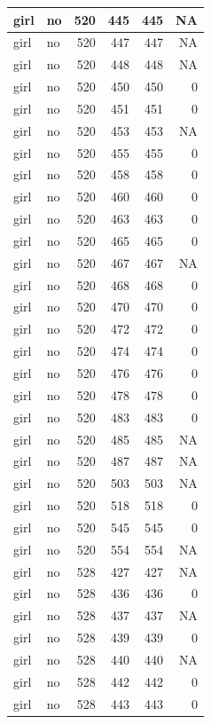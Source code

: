 \documentclass[man]{apa6}
\begin{document}
\begin{tabular}{l|l|r|r|r|r}
\hline
girl & no & 520 & 445 & 445 & NA\\
\hline
girl & no & 520 & 447 & 447 & NA\\
\hline
girl & no & 520 & 448 & 448 & NA\\
\hline
girl & no & 520 & 450 & 450 & 0\\
\hline
girl & no & 520 & 451 & 451 & 0\\
\hline
girl & no & 520 & 453 & 453 & NA\\
\hline
girl & no & 520 & 455 & 455 & 0\\
\hline
girl & no & 520 & 458 & 458 & 0\\
\hline
girl & no & 520 & 460 & 460 & 0\\
\hline
girl & no & 520 & 463 & 463 & 0\\
\hline
girl & no & 520 & 465 & 465 & 0\\
\hline
girl & no & 520 & 467 & 467 & NA\\
\hline
girl & no & 520 & 468 & 468 & 0\\
\hline
girl & no & 520 & 470 & 470 & 0\\
\hline
girl & no & 520 & 472 & 472 & 0\\
\hline
girl & no & 520 & 474 & 474 & 0\\
\hline
girl & no & 520 & 476 & 476 & 0\\
\hline
girl & no & 520 & 478 & 478 & 0\\
\hline
girl & no & 520 & 483 & 483 & 0\\
\hline
girl & no & 520 & 485 & 485 & NA\\
\hline
girl & no & 520 & 487 & 487 & NA\\
\hline
girl & no & 520 & 503 & 503 & NA\\
\hline
girl & no & 520 & 518 & 518 & 0\\
\hline
girl & no & 520 & 545 & 545 & 0\\
\hline
girl & no & 520 & 554 & 554 & NA\\
\hline
girl & no & 528 & 427 & 427 & NA\\
\hline
girl & no & 528 & 436 & 436 & 0\\
\hline
girl & no & 528 & 437 & 437 & NA\\
\hline
girl & no & 528 & 439 & 439 & 0\\
\hline
girl & no & 528 & 440 & 440 & NA\\
\hline
girl & no & 528 & 442 & 442 & 0\\
\hline
girl & no & 528 & 443 & 443 & 0\\

\end{tabular}
\end{document}
